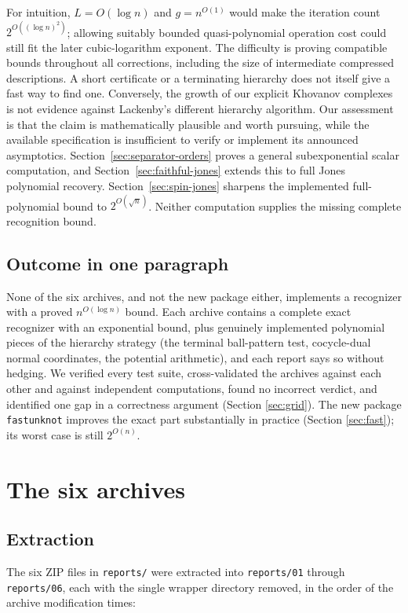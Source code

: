 \documentclass[11pt]{article}
\theoremstyle{remark}
\newcommand{\code}[1]{\texttt{#1}}
\newcommand{\qp}{n^{O(\log n)}}
\begin{document}
For intuition, $L=O(\log n)$ and $g=n^{O(1)}$ would make the iteration
count $2^{O((\log n)^2)}$; allowing suitably bounded quasi-polynomial
operation cost could still fit the later cubic-logarithm exponent.
The difficulty is proving compatible bounds throughout all corrections,
including the size of intermediate compressed descriptions.  A short
certificate or a terminating hierarchy does not itself give a fast way to
find one.  Conversely, the growth of our explicit Khovanov complexes is not
evidence against Lackenby's different hierarchy algorithm.  Our assessment
is that the claim is mathematically plausible and worth pursuing, while the
available specification is insufficient to verify or implement its announced
asymptotics.  Section~\ref{sec:separator-orders} proves a general
subexponential scalar computation, and Section~\ref{sec:faithful-jones}
extends this to full Jones polynomial recovery. Section~\ref{sec:spin-jones}
sharpens the implemented full-polynomial bound to
$2^{O(\sqrt n)}$. Neither computation
supplies the missing complete recognition bound.

\subsection{Outcome in one paragraph}
None of the six archives, and not the new package either, implements a
recognizer with a proved $\qp$ bound. Each archive contains a complete exact
recognizer with an exponential bound, plus genuinely implemented polynomial
pieces of the hierarchy strategy (the terminal ball-pattern test, cocycle-dual
normal coordinates, the potential arithmetic), and each report says so
without hedging. We verified every test suite, cross-validated the archives
against each other and against independent computations, found no incorrect
verdict, and identified one gap in a correctness argument (Section
\ref{sec:grid}). The new package \code{fastunknot} improves the exact part
substantially in practice (Section \ref{sec:fast}); its worst case is still
$2^{O(n)}$.

\section{The six archives}

\subsection{Extraction}
The six ZIP files in \code{reports/} were extracted into \code{reports/01}
through \code{reports/06}, each with the single wrapper directory removed, in
the order of the archive modification times:
\end{document}
